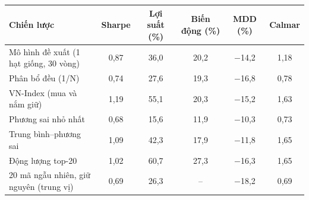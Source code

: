 \begin{tabular}{@{}lccccc@{}}
\toprule
Chiến lược & Sharpe & Lợi suất (\%) & Biến động (\%) & MDD (\%) & Calmar \\
\midrule
Mô hình đề xuất (1 hạt giống, 30 vòng) & 0{,}87 & 36{,}0 & 20{,}2 & $-$14{,}2 & 1{,}18 \\
\midrule
Phân bổ đều (1/N) & 0{,}74 & 27{,}6 & 19{,}3 & $-$16{,}8 & 0{,}78 \\
VN-Index (mua và nắm giữ) & 1{,}19 & 55{,}1 & 20{,}3 & $-$15{,}2 & 1{,}63 \\
Phương sai nhỏ nhất & 0{,}68 & 15{,}6 & 11{,}9 & $-$10{,}3 & 0{,}73 \\
Trung bình--phương sai & 1{,}09 & 42{,}3 & 17{,}9 & $-$11{,}8 & 1{,}65 \\
Động lượng top-20 & 1{,}02 & 60{,}7 & 27{,}3 & $-$16{,}3 & 1{,}65 \\
20 mã ngẫu nhiên, giữ nguyên (trung vị) & 0{,}69 & 26{,}3 & -- & $-$18{,}2 & 0{,}69 \\
\bottomrule
\end{tabular}
